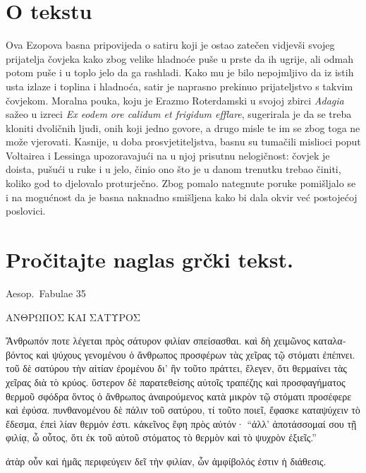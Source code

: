 


\section*{O tekstu}

Ova Ezopova basna pripovijeda o satiru koji je ostao zatečen vidjevši svojeg prijatelja čovjeka kako zbog velike hladnoće puše u prste da ih ugrije, ali odmah potom puše i u toplo jelo da ga rashladi. Kako mu je bilo nepojmljivo da iz istih usta izlaze i toplina i hladnoća, satir je naprasno prekinuo prijateljstvo s takvim čovjekom. Moralna pouka, koju je Erazmo Roterdamski u svojoj zbirci \textit{Adagia} sažeo u izreci \textit{Ex eodem ore calidum et frigidum efflare}, sugerirala je da se treba kloniti dvoličnih ljudi, onih koji jedno govore, a drugo misle te im se zbog toga ne može vjerovati. Kasnije, u doba prosvjetiteljstva, basnu su tumačili mislioci poput Voltairea i Lessinga upozoravajući na u njoj prisutnu nelogičnost: čovjek je doista, pušući u ruke i u jelo, činio ono što je u danom trenutku trebao činiti, koliko god to djelovalo proturječno. Zbog pomalo nategnute poruke pomišljalo se i na mogućnost da je basna naknadno smišljena kako bi dala okvir već postojećoj poslovici.


\section*{Pročitajte naglas grčki tekst.}
Aesop.\ Fabulae 35

\medskip

{\large
\begin{greek}
\noindent ΑΝΘΡΩΠΟΣ ΚΑΙ ΣΑΤΥΡΟΣ 

\noindent Ἄνθρωπόν ποτε λέγεται πρὸς σάτυρον φιλίαν σπείσασθαι. καὶ δὴ χειμῶνος καταλαβόντος καὶ ψύχους γενομένου ὁ ἄνθρωπος προσφέρων τὰς χεῖρας τῷ στόματι ἐπέπνει. τοῦ δὲ σατύρου τὴν αἰτίαν ἐρομένου δι' ἣν τοῦτο πράττει, ἔλεγεν, ὅτι θερμαίνει τὰς χεῖρας διὰ τὸ κρύος. ὕστερον δὲ παρατεθείσης αὐτοῖς τραπέζης καὶ προσφαγήματος θερμοῦ σφόδρα ὄντος ὁ ἄνθρωπος ἀναιρούμενος κατὰ μικρὸν τῷ στόματι προσέφερε καὶ ἐφύσα. πυνθανομένου δὲ πάλιν τοῦ σατύρου, τί τοῦτο ποιεῖ, ἔφασκε καταψύχειν τὸ ἔδεσμα, ἐπεὶ λίαν θερμόν ἐστι. κἀκεῖνος ἔφη πρὸς αὐτόν· ``ἀλλ' ἀποτάσσομαί σου τῇ φιλίᾳ, ὦ οὗτος, ὅτι ἐκ τοῦ αὐτοῦ στόματος τὸ θερμὸν καὶ τὸ ψυχρὸν ἐξιεῖς.''

ἀτὰρ οὖν καὶ ἡμᾶς περιφεύγειν δεῖ τὴν φιλίαν, ὧν ἀμφίβολός ἐστιν ἡ διάθεσις.

\end{greek}

}

